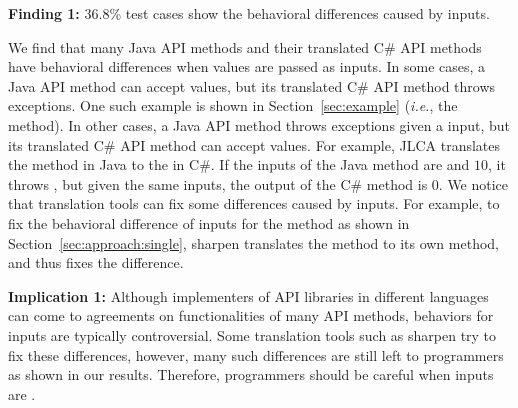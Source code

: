 \textbf{Finding 1:} 36.8\% test cases show the behavioral differences caused by  inputs.

We find that many Java API methods and their translated C\# API methods have behavioral differences when  values are passed as inputs. In some cases, a Java API method can accept  values, but its translated C\# API method throws exceptions. One such example is shown in Section~\ref{sec:example} (\emph{i.e.}, the  method). In other cases, a Java API method throws exceptions given a  input, but its translated C\# API method can accept  values. For example, JLCA translates the  method in Java to the  in C\#. If the inputs of the Java method are  and $10$, it throws , but given the same inputs, the output of the C\# method is 0. We notice that translation tools can fix some differences caused by  inputs. For example, to fix the behavioral difference of  inputs for the  method as shown in Section~\ref{sec:approach:single}, sharpen translates the method to its own method, and thus fixes the difference.


\textbf{Implication 1:} Although implementers of API libraries in different languages can come to agreements on functionalities of many API methods, behaviors for  inputs are typically controversial. Some translation tools such as sharpen try to fix these differences, however, many such differences are still left to programmers as shown in our results. Therefore, programmers should be careful when inputs are .

